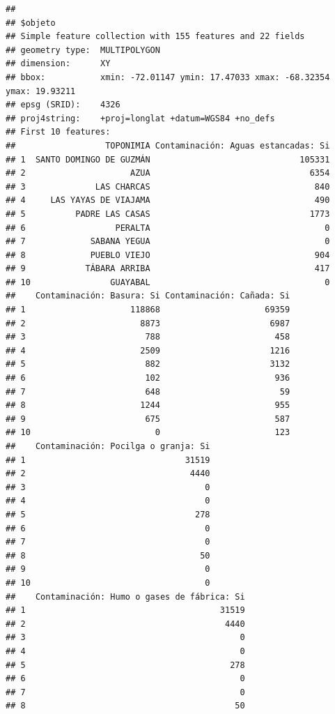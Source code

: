 \documentclass[11pt,]{article}
\begin{document}
\begin{verbatim}
## 
## $objeto
## Simple feature collection with 155 features and 22 fields
## geometry type:  MULTIPOLYGON
## dimension:      XY
## bbox:           xmin: -72.01147 ymin: 17.47033 xmax: -68.32354 ymax: 19.93211
## epsg (SRID):    4326
## proj4string:    +proj=longlat +datum=WGS84 +no_defs
## First 10 features:
##                  TOPONIMIA Contaminación: Aguas estancadas: Si
## 1  SANTO DOMINGO DE GUZMÁN                              105331
## 2                     AZUA                                6354
## 3              LAS CHARCAS                                 840
## 4     LAS YAYAS DE VIAJAMA                                 490
## 5          PADRE LAS CASAS                                1773
## 6                  PERALTA                                   0
## 7             SABANA YEGUA                                   0
## 8             PUEBLO VIEJO                                 904
## 9            TÁBARA ARRIBA                                 417
## 10                GUAYABAL                                   0
##    Contaminación: Basura: Si Contaminación: Cañada: Si
## 1                     118868                     69359
## 2                       8873                      6987
## 3                        788                       458
## 4                       2509                      1216
## 5                        882                      3132
## 6                        102                       936
## 7                        648                        59
## 8                       1244                       955
## 9                        675                       587
## 10                         0                       123
##    Contaminación: Pocilga o granja: Si
## 1                                31519
## 2                                 4440
## 3                                    0
## 4                                    0
## 5                                  278
## 6                                    0
## 7                                    0
## 8                                   50
## 9                                    0
## 10                                   0
##    Contaminación: Humo o gases de fábrica: Si
## 1                                       31519
## 2                                        4440
## 3                                           0
## 4                                           0
## 5                                         278
## 6                                           0
## 7                                           0
## 8                                          50

\end{verbatim}
\end{document}
